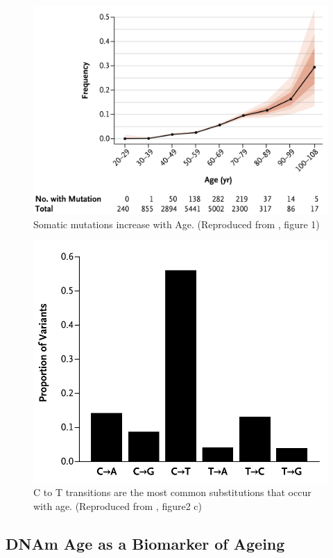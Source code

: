 \documentclass[
]{book}
\begin{document}
\begin{figure}

{\centering \includegraphics[width=0.6\linewidth]{figs/Jaiswal2014fig1_somaticMutationAge} 

}

\caption{Somatic mutations increase with Age.
(Reproduced from \citep{Jaiswal2014c}, figure 1)}\label{fig:Jaiswal2014fig1}
\end{figure}




\begin{figure}

{\centering \includegraphics[width=0.6\linewidth]{figs/Jaiswal2014fig2c} 

}

\caption{C to T transitions are the most common substitutions that occur with age.
(Reproduced from \citep{Jaiswal2014c}, figure2 c)}\label{fig:Jaiswal2014fig2c}
\end{figure}




\hypertarget{dnam-age-as-a-biomarker-of-ageing}{%
\subsection{DNAm Age as a Biomarker of Ageing}\label{dnam-age-as-a-biomarker-of-ageing}}
\end{document}
